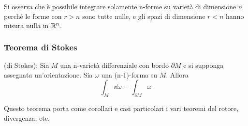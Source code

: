 Si osserva che è possibile integrare solamente n-forme su varietà di dimensione $n$
perchè le forme con $r>n$ sono tutte nulle, e gli spazi di dimensione $r<n$ hanno
misura nulla in $\mathbb{R}^n$.

\subsubsection{Teorema di Stokes}
\begin{theorem}{(di Stokes)}:
   Sia $M$ una n-varietà differenziale con bordo $\partial M$ e si supponga assegnata
   un'orientazione. Sia $\omega$ una (n-1)-forma su $M$. Allora
   \begin{equation}\label{eq:stokestheorem}
      \int_M \dd \omega = \int_{\partial M} \omega
   \end{equation}
\end{theorem}
Questo teorema porta come corollari e casi particolari i vari teoremi del rotore,
divergenza, etc.
%
%
